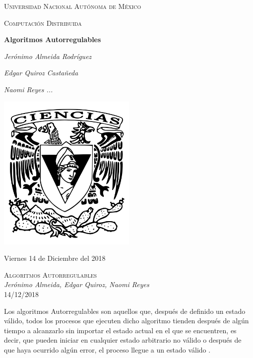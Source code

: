 \documentclass[12pt,a4paper]{article}
\begin{document}
\begin{titlepage}
	\centering
	{\scshape\LARGE Universidad Nacional Autónoma de México \par}
	\vspace{1cm}
	{\scshape\Large Computación Distribuida\par}
	\vspace{1cm}
	{\huge\bfseries Algoritmos Autorregulables\par}
	\vspace{1cm}
    {\Large\itshape Jerónimo Almeida Rodríguez \par}
    \vspace{.5cm}
	{\Large\itshape Edgar Quiroz Castañeda \par}
    \vspace{.5cm}
	{\Large\itshape Naomi Reyes ...\par}
	\vfill
	\includegraphics[width=0.5\textwidth]{escudo_f-ciencias.png}
	\vfill

	{\large Viernes 14 de Diciembre del 2018 \par}
\end{titlepage}

	\pagebreak
	\setlength{\voffset}{-0.75in}
	\setlength{\headsep}{5pt}


\begin{center}
		\textsc{\huge Algoritmos Autorregulables\\}
		\textit{Jerónimo Almeida, Edgar Quiroz, Naomi Reyes\\}
        14/12/2018
\end{center}

Los algoritmos Autorregulables son aquellos que, después de definido un estado
válido, todos los procesos que ejecuten dicho algoritmo tienden después de
algún tiempo a alcanzarlo sin importar el estado actual en el que se encuentren,
es decir, que pueden iniciar en cualquier estado arbitrario no válido o después
de que haya ocurrido algún error, el proceso llegue a un estado válido .
\end{document}
